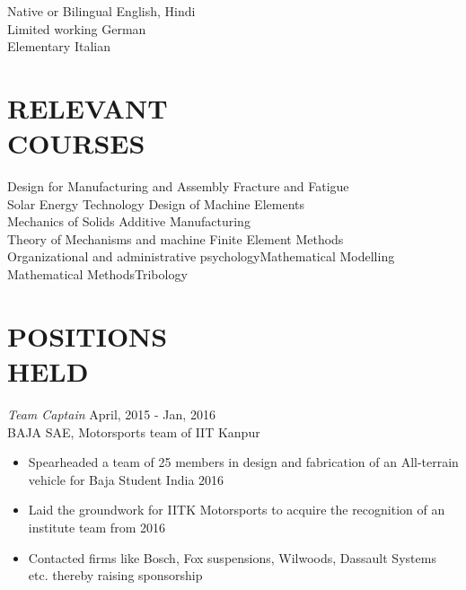 \documentclass[margin, 10pt]{res} %
\begin{document}
\begin{resume}

Native or Bilingual \hspace{6.5ex} English, Hindi            \\
Limited working \hspace{9.2ex} German          \\
Elementary \hspace{14.4ex} Italian           \\
\section{RELEVANT \\ COURSES}
Design for Manufacturing and Assembly \hfill Fracture and Fatigue            \\
Solar Energy Technology \hfill Design of Machine Elements\\
Mechanics of Solids \hfill Additive Manufacturing\\
Theory of Mechanisms and machine \hfill Finite Element Methods\\
Organizational and administrative psychology\hfill Mathematical Modelling\\
Mathematical Methods\hfill Tribology



 






\section{ POSITIONS \\HELD}

{\sl Team Captain} \hfill April, 2015 - Jan, 2016\\
BAJA SAE, Motorsports team of IIT Kanpur\\ 
\begin{itemize} \itemsep -2pt

\item Spearheaded a team of 25 members in design and fabrication of an All-terrain vehicle for Baja Student India 2016
\item Laid the groundwork for IITK Motorsports to acquire the recognition of an institute team from  2016
\item Contacted firms like Bosch, Fox suspensions, Wilwoods, Dassault Systems etc. thereby  raising sponsorship

\end{itemize}

\clearpage

\end{resume}
\end{document}
